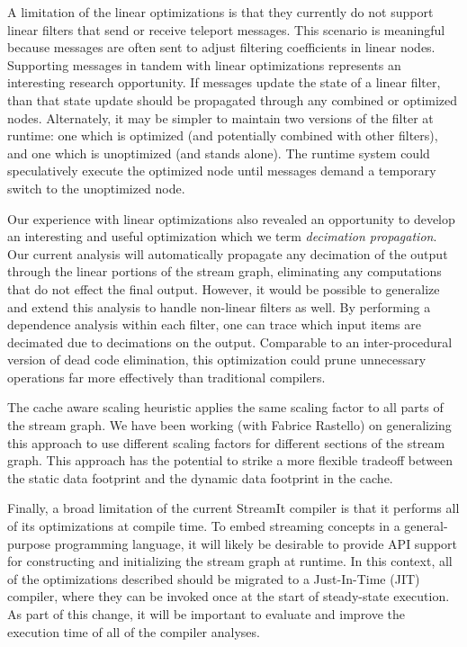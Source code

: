 A limitation of the linear optimizations is that they currently do not
support linear filters that send or receive teleport messages.  This
scenario is meaningful because messages are often sent to adjust
filtering coefficients in linear nodes.  Supporting messages in tandem
with linear optimizations represents an interesting research
opportunity.  If messages update the state of a linear filter, than
that state update should be propagated through any combined or
optimized nodes.  Alternately, it may be simpler to maintain two
versions of the filter at runtime: one which is optimized (and
potentially combined with other filters), and one which is unoptimized
(and stands alone).  The runtime system could speculatively execute
the optimized node until messages demand a temporary switch to the
unoptimized node.

Our experience with linear optimizations also revealed an opportunity
to develop an interesting and useful optimization which we term {\it
decimation propagation}.  Our current analysis will automatically
propagate any decimation of the output through the linear portions of
the stream graph, eliminating any computations that do not effect the
final output.  However, it would be possible to generalize and extend
this analysis to handle non-linear filters as well.  By performing a
dependence analysis within each filter, one can trace which input
items are decimated due to decimations on the output.  Comparable to
an inter-procedural version of dead code elimination, this
optimization could prune unnecessary operations far more effectively
than traditional compilers.

The cache aware scaling heuristic applies the same scaling factor to
all parts of the stream graph.  We have been working (with Fabrice
Rastello) on generalizing this approach to use different scaling
factors for different sections of the stream graph.  This approach has
the potential to strike a more flexible tradeoff between the static
data footprint and the dynamic data footprint in the cache.

Finally, a broad limitation of the current StreamIt compiler is that
it performs all of its optimizations at compile time.  To embed
streaming concepts in a general-purpose programming language, it will
likely be desirable to provide API support for constructing and
initializing the stream graph at runtime.  In this context, all of the
optimizations described should be migrated to a Just-In-Time (JIT)
compiler, where they can be invoked once at the start of steady-state
execution.  As part of this change, it will be important to evaluate
and improve the execution time of all of the compiler analyses.

